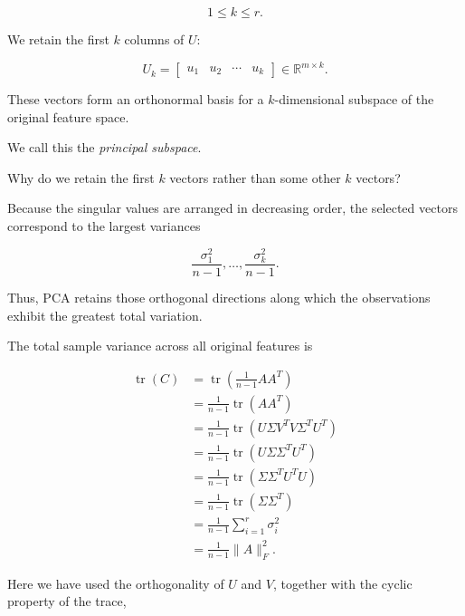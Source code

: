 \documentclass[11pt]{article}
\begin{document}
\[
1\leq k\leq r.
\]

We retain the first $k$
columns of $U$:

\[
\boxed{
U_k=
\begin{bmatrix}
u_1 & u_2 & \cdots & u_k
\end{bmatrix}
\in\mathbb{R}^{m\times k}.
}
\]

These vectors form an
orthonormal basis for a
$k$-dimensional subspace
of the original feature space.

We call this the
\textit{principal subspace}.

Why do we retain the first
$k$ vectors rather than
some other $k$ vectors?

Because the singular values
are arranged in decreasing order,
the selected vectors correspond
to the largest variances

\[
\frac{\sigma_1^2}{n-1},
\ldots,
\frac{\sigma_k^2}{n-1}.
\]

Thus, PCA retains those
orthogonal directions along
which the observations exhibit
the greatest total variation.

The total sample variance
across all original features is

\[
\begin{aligned}
\operatorname{tr}(C)
&=\operatorname{tr}
\left(\frac{1}{n-1}AA^T\right)\\[2mm]
&=\frac{1}{n-1}\operatorname{tr}(AA^T)\\[2mm]
&=\frac{1}{n-1}
\operatorname{tr}
\left(U\Sigma V^T V\Sigma^TU^T\right)\\[2mm]
&=\frac{1}{n-1}
\operatorname{tr}
\left(U\Sigma\Sigma^TU^T\right)\\[2mm]
&=\frac{1}{n-1}
\operatorname{tr}
\left(\Sigma\Sigma^TU^TU\right)\\[2mm]
&=\frac{1}{n-1}
\operatorname{tr}\left(\Sigma\Sigma^T\right)\\[2mm]
&=\frac{1}{n-1}
\sum_{i=1}^{r}\sigma_i^2\\[2mm]
&=\frac{1}{n-1}\|A\|_F^2.
\end{aligned}
\]

Here we have used the orthogonality
of $U$ and $V$, together with the
cyclic property of the trace,
\end{document}
